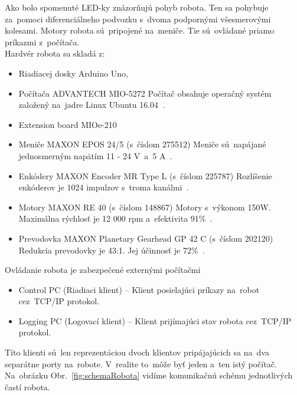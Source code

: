 \clearpage

Ako bolo spomenuté LED-ky znázorňujú pohyb robota. Ten sa pohybuje za~pomoci diferenciálneho podvozku s~dvoma
podpornými všesmerovými kolesami. Motory robota sú~pripojené na~meniče. Tie sú~ovládané priamo príkazmi z~počítača.\\

\noindent Hardvér robota sa skladá z:
\begin{itemize}
	\item Riadiacej dosky Arduino Uno,

	\item Počítača ADVANTECH MIO-5272 \newline
		Počítač obsahuje operačný systém založený na~jadre Linux Ubuntu 16.04~\cite{robotPc}.

	\item Extension board MIOe-210~\cite{extensionModule}

	\item Meniče MAXON EPOS 24/5 (s~číslom 275512) \newline
	 	Meniče sú~napájané jednosmerným napätím 11 - 24 V~a~5 A~\cite{menic}.

	\item Enkódery MAXON Encoder MR Type L (s~číslom 225787) \newline
		Rozlíšenie enkóderov je 1024 impulzov s~troma kanálmi~\cite{encoder}.

	\item Motory MAXON RE 40 (s~číslom 148867) \newline
		Motory s~výkonom 150W. Maximálna rýchlosť je 12 000 rpm a~efektivita 91\%~\cite{motor}.

	\item Prevodovka MAXON Planetary Gearhead GP 42 C (s~číslom 202120) \newline
		Redukcia prevodovky je 43:1. Jej účinnosť je 72\%~\cite{prevodovka}.
\end{itemize}

\noindent Ovládanie robota je zabezpečené externými počítačmi
\begin{itemize}
	\item Control PC (Riadiaci klient) -- Klient posielajúci príkazy na~robot cez~TCP/IP protokol.
	\item Logging PC (Logovací klient) -- Klient prijímajúci stav robota cez~TCP/IP protokol.
\end{itemize}

\noindent Títo klienti sú~len reprezentáciou dvoch klientov pripájajúcich sa na~dva separátne porty na~robote.
V~realite to~môže byť jeden a~ten istý počítač. Na~obrázku Obr.~\ref{fig:schemaRobota} vidíme komunikačnú schému
jednotlivých častí robota.

